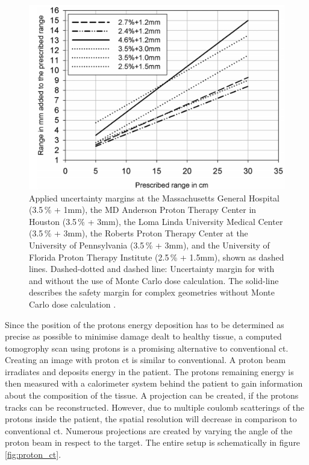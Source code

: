 \begin{figure}
  \centering
  \includegraphics[height=0.6\textwidth]{images/prescription.png}
  \caption{Applied uncertainty margins at the Massachusetts General Hospital (3.5\,\% +
1mm), the MD Anderson Proton Therapy Center in Houston (3.5\,\% + 3mm), the Loma Linda
University Medical Center (3.5\,\% + 3mm), the Roberts Proton Therapy Center at the
University of Pennsylvania (3.5\,\% + 3mm), and the University of Florida Proton Therapy
Institute (2.5\,\% + 1.5mm), shown as dashed lines. Dashed-dotted and dashed line: Uncertainty margin for with and without the use of Monte Carlo dose calculation.
The solid-line describes the safety margin for complex geometries without Monte Carlo dose calculation \cite{paganetti}.}
  \label{fig:paganetti}
\end{figure}

Since the position of the protons energy deposition has to be determined as precise as possible to minimise damage dealt to healthy tissue, a computed tomogrophy scan using protons
is a promising alternative to conventional ct. Creating an image with proton ct is similar to conventional. A proton beam irradiates and deposits energy in the patient. The
protons remaining energy is then measured with a calorimeter system behind the patient to gain information about the composition of the tissue. A projection can be created,
if the protons tracks can be reconstructed. However, due to multiple coulomb scatterings of the protons inside the patient, the spatial resolution will decrease in comparison
to conventional ct. Numerous projections are created by varying the angle of the proton beam in respect to the target. The entire setup is schematically in figure \ref{fig:proton_ct}.

